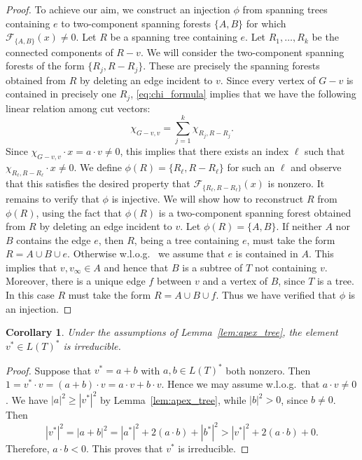 \documentclass[11pt]{amsart}
\newtheorem{cor}[thm]{Corollary}
\numberwithin{equation}{section}
\def\cF{{\mathcal F}}
\newcommand{\norm}[1]{\left| #1 \right|^2}
\begin{document}
\begin{proof}
    To achieve our aim, we construct an injection $\phi$ from spanning trees containing $e$ to two-component spanning forests $\{A,B\}$ for which $\cF_{\{A,B\}}(x)\neq 0$.
    Let $R$ be a spanning tree containing $e$.
    Let $R_1, \dots, R_k$ be the connected components of $R-v$. We will consider the two-component spanning forests of the form $\{R_j,R-R_j\}$. These are precisely the spanning forests obtained from $R$ by deleting an edge incident to $v$. Since every vertex of $G-v$ is contained in precisely one $R_j$, \eqref{eq:chi_formula} implies that we have the following linear relation among cut vectors:
    \[
    \chi_{G-v,v}=\sum_{j=1}^k\chi_{R_j,R-R_j}.
    \]
    Since $\chi_{G-v,v}\cdot x=a\cdot v\neq 0$, this implies that there exists an index $\ell$ such that $\chi_{R_\ell,R-R_\ell}\cdot x\neq 0$. We define $\phi(R)=\{R_\ell,R-R_\ell\}$ for such an $\ell$ and observe that this satisfies the desired property that $\cF_{\{R_\ell,R-R_\ell\}}(x)$ is nonzero. It remains to verify that $\phi$ is injective. We will show how to reconstruct $R$ from $\phi(R)$, using the fact that $\phi(R)$ is a two-component spanning forest obtained from $R$ by deleting an edge incident to $v$. Let $\phi(R)=\{A,B\}$. If neither $A$ nor $B$ contains the edge $e$, then $R$, being a tree containing $e$, must take the form $R=A\cup B\cup e$. Otherwise w.l.o.g.~ we assume that $e$ is contained in $A$. This implies that $v, v_\infty\in A$ and hence that $B$ is a subtree of $T$ not containing $v$. Moreover, there is a unique edge $f$ between $v$ and a vertex of $B$, since $T$ is a tree. In this case $R$ must take the form $R=A\cup B\cup f$. Thus we have verified that $\phi$ is an injection. 
\end{proof}

\begin{cor}
\label{cor:apex_tree}
Under the assumptions of Lemma~\ref{lem:apex_tree}, the element $v^* \in L(T)^*$ is irreducible.
\end{cor}

\begin{proof}
    Suppose that $v^* = a+b$ with $a,b \in L(T)^*$ both nonzero.
    Then $1 = v^* \cdot v = (a+b) \cdot v = a \cdot v + b \cdot v$.
    Hence we may assume w.l.o.g.~that $a \cdot v \ne 0$.
    We have $\norm{a}\ge \norm{v^*}$ by Lemma~\ref{lem:apex_tree}, while $\norm{b} > 0$, since $b \ne 0$.
    Then
    \[
    \norm{v^*}= \norm{a+b}= \norm{a^*}+ 2(a \cdot b) + \norm{b^*}> \norm{v^*}+ 2 (a \cdot b) + 0.
    \]
    Therefore, $a \cdot b < 0$.
    This proves that $v^*$ is irreducible.
\end{proof}
\end{document}
